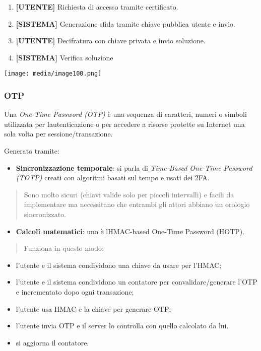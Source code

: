 \begin{enumerate}
\def\labelenumi{\arabic{enumi}.}
\item
  \textbf{{[}UTENTE{]}} Richiesta di accesso tramite certificato.
\item
  \textbf{{[}SISTEMA{]}} Generazione sfida tramite chiave pubblica
  utente e invio.
\item
  \textbf{{[}UTENTE{]}} Decifratura con chiave privata e invio
  soluzione.
\item
  \textbf{{[}SISTEMA{]}} Verifica soluzione
\end{enumerate}

\texttt{[image: media/image100.png]}

\subsubsection{OTP}\label{otp}

Una \emph{One-Time Password (OTP)} è una sequenza di caratteri, numeri o
simboli utilizzata per l\textquotesingle autenticazione o per accedere a
risorse protette su Internet una sola volta per sessione/transazione.

Generata tramite:

\begin{itemize}
\item
  \textbf{Sincronizzazione temporale}: si parla di \emph{Time-Based
  One-Time Password (TOTP)} creati con algoritmi basati sul tempo e
  usati dei 2FA.
\end{itemize}

\begin{quote}
Sono molto sicuri (chiavi valide solo per piccoli intervalli) e facili
da implementare ma necessitano che entrambi gli attori abbiano un
orologio sincronizzato.
\end{quote}

\begin{itemize}
\item
  \textbf{Calcoli matematici}: uno è l\textquotesingle HMAC-based
  One-Time Password (HOTP).
\end{itemize}

\begin{quote}
Funziona in questo modo:
\end{quote}

\begin{itemize}
\item
  l'utente e il sistema condividono una chiave da usare per l'HMAC;
\item
  l'utente e il sistema condividono un contatore per
  convalidare/generare l'OTP e incrementato dopo ogni transazione;
\item
  l'utente usa HMAC e la chiave per generare OTP;
\item
  l'utente invia OTP e il server lo controlla con quello calcolato da
  lui.
\item
  si aggiorna il contatore.
\end{itemize}

